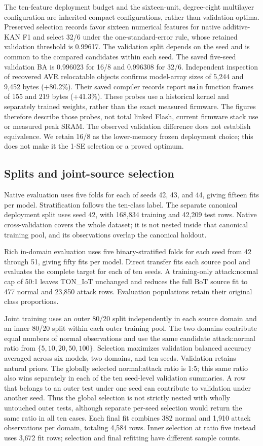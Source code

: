 \documentclass{ieeeaccess}
\begin{document}
The ten-feature deployment budget and the sixteen-unit, degree-eight multilayer configuration are inherited compact configurations, rather than validation optima. Preserved selection records favor sixteen numerical features for native additive-KAN F1 and select 32/6 under the one-standard-error rule, whose retained validation threshold is 0.99617. The validation split depends on the seed and is common to the compared candidates within each seed. The saved five-seed validation BA is 0.996023 for 16/8 and 0.996308 for 32/6. Independent inspection of recovered AVR relocatable objects confirms model-array sizes of 5,244 and 9,452 bytes (+80.2\%). Their saved compiler records report \texttt{main} function frames of 155 and 219 bytes (+41.3\%). These probes use a historical kernel and separately trained weights, rather than the exact measured firmware. The figures therefore describe those probes, not total linked Flash, current firmware stack use or measured peak SRAM. The observed validation difference does not establish equivalence. We retain 16/8 as the lower-memory frozen deployment choice; this does not make it the 1-SE selection or a proved optimum.

\subsection{Splits and joint-source selection}
Native evaluation uses five folds for each of seeds 42, 43, and 44, giving fifteen fits per model. Stratification follows the ten-class label. The separate canonical deployment split uses seed 42, with 168,834 training and 42,209 test rows. Native cross-validation covers the whole dataset; it is not nested inside that canonical training pool, and its observations overlap the canonical holdout.

Rich in-domain evaluation uses five binary-stratified folds for each seed from 42 through 51, giving fifty fits per model. Direct transfer fits each source pool and evaluates the complete target for each of ten seeds. A training-only attack:normal cap of 50:1 leaves TON\_IoT unchanged and reduces the full BoT source fit to 477 normal and 23,850 attack rows. Evaluation populations retain their original class proportions.

Joint training uses an outer 80/20 split independently in each source domain and an inner 80/20 split within each outer training pool. The two domains contribute equal numbers of normal observations and use the same candidate attack:normal ratio from $\{5,10,20,50,100\}$. Selection maximizes validation balanced accuracy averaged across six models, two domains, and ten seeds. Validation retains natural priors. The globally selected normal:attack ratio is 1:5; this same ratio also wins separately in each of the ten seed-level validation summaries. A row that belongs to an outer test under one seed can contribute to validation under another seed. Thus the global selection is not strictly nested with wholly untouched outer tests, although separate per-seed selection would return the same ratio in all ten cases. Each final fit combines 382 normal and 1,910 attack observations per domain, totaling 4,584 rows. Inner selection at ratio five instead uses 3,672 fit rows; selection and final refitting have different sample counts.
\end{document}
